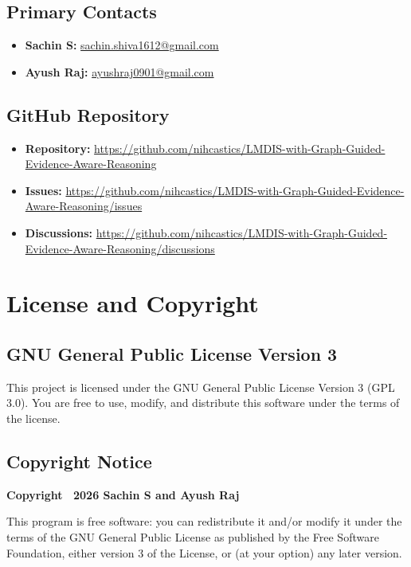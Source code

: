 \documentclass[11pt,a4paper]{article}
\begin{document}
\subsection{Primary Contacts}

\begin{itemize}[leftmargin=*]
    \item \textbf{Sachin S:} \url{sachin.shiva1612@gmail.com}
    \item \textbf{Ayush Raj:} \url{ayushraj0901@gmail.com}
\end{itemize}

\subsection{GitHub Repository}

\begin{itemize}[leftmargin=*]
    \item \textbf{Repository:} \url{https://github.com/nihcastics/LMDIS-with-Graph-Guided-Evidence-Aware-Reasoning}
    \item \textbf{Issues:} \url{https://github.com/nihcastics/LMDIS-with-Graph-Guided-Evidence-Aware-Reasoning/issues}
    \item \textbf{Discussions:} \url{https://github.com/nihcastics/LMDIS-with-Graph-Guided-Evidence-Aware-Reasoning/discussions}
\end{itemize}

\clearpage
\section{License and Copyright}

\subsection{GNU General Public License Version 3}

This project is licensed under the GNU General Public License Version 3 (GPL 3.0). You are free to use, modify, and distribute this software under the terms of the license.

\subsection{Copyright Notice}

\textbf{Copyright \textcopyright\ 2026 Sachin S and Ayush Raj}

This program is free software: you can redistribute it and/or modify it under the terms of the GNU General Public License as published by the Free Software Foundation, either version 3 of the License, or (at your option) any later version.
\end{document}
